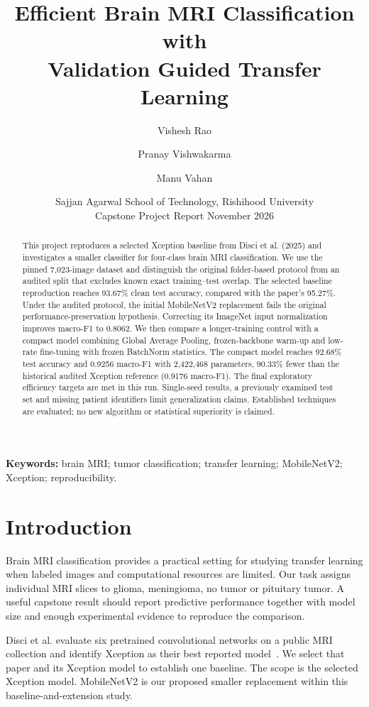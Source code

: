 \documentclass[11pt,a4paper]{article}
\title{\textbf{Efficient Brain MRI Classification with\\Validation Guided Transfer Learning}}
\author{Vishesh Rao \and Pranay Vishwakarma \and Manu Vahan}
\date{\small Sajjan Agarwal School of Technology, Rishihood University\\Capstone Project Report\quad 3 November 2026}
\begin{document}
\maketitle

\begin{abstract}
This project reproduces a selected Xception baseline from Disci et al. (2025)
and investigates a smaller classifier for four-class brain MRI classification.
We use the pinned 7,023-image dataset and distinguish the original folder-based
protocol from an audited split that excludes known exact training--test overlap.
The selected baseline reproduction reaches 93.67\% clean test accuracy, compared
with the paper's 95.27\%. Under the audited protocol, the initial MobileNetV2
replacement fails the original performance-preservation hypothesis. Correcting
its ImageNet input normalization improves macro-F1 to 0.8062. We then compare a
longer-training control with a compact model combining Global Average Pooling,
frozen-backbone warm-up and low-rate fine-tuning with frozen BatchNorm statistics.
The compact model reaches 92.68\% test accuracy and 0.9256 macro-F1 with 2,422,468
parameters, 90.33\% fewer than the historical audited Xception reference
(0.9176 macro-F1). The final exploratory efficiency targets are met in this run.
Single-seed results, a previously examined test set and missing patient
identifiers limit generalization claims. Established techniques are evaluated;
no new algorithm or statistical superiority is claimed.
\end{abstract}
\noindent\textbf{Keywords:} brain MRI; tumor classification; transfer learning;
MobileNetV2; Xception; reproducibility.

\section{Introduction}
Brain MRI classification provides a practical setting for studying transfer
learning when labeled images and computational resources are limited. Our task
assigns individual MRI slices to glioma, meningioma, no tumor or pituitary tumor.
A useful capstone result should report predictive performance together with
model size and enough experimental evidence to reproduce the comparison.

Disci et al. evaluate six pretrained convolutional networks on a public MRI
collection and identify Xception as their best reported model~\cite{disci2025}.
We select that paper and its Xception model to establish one baseline. The scope is the selected Xception model. MobileNetV2 is our proposed
smaller replacement within this baseline-and-extension study.
\end{document}
